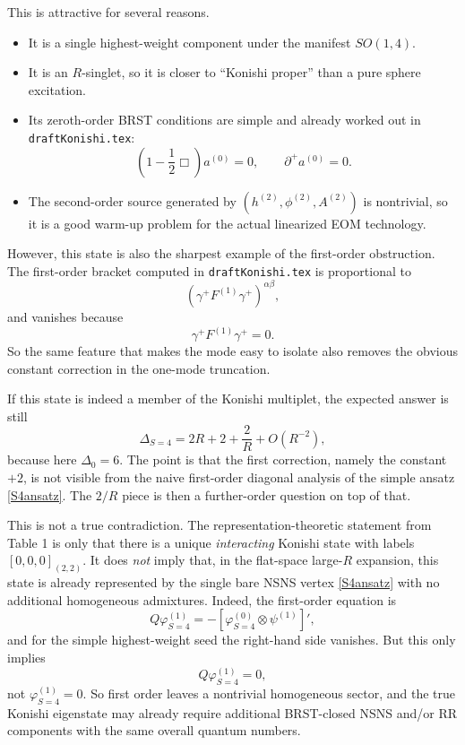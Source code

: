 \documentclass[12pt]{article}
\def\be{\begin{equation}}
\def\ee{\end{equation}}
\newcommand{\D}{\ensuremath{\Delta}}
\begin{document}
This is attractive for several reasons.
\begin{itemize}
\item It is a single highest-weight component under the manifest $SO(1,4)$.
\item It is an $R$-singlet, so it is closer to ``Konishi proper'' than a pure sphere excitation.
\item Its zeroth-order BRST conditions are simple and already worked out in \texttt{draftKonishi.tex}:
\be
\left(1-\frac{1}{2}\Box\right)a^{(0)}=0,\qquad \partial^+ a^{(0)}=0.
\label{S4BRST}
\ee
\item The second-order source generated by $(h^{(2)},\phi^{(2)},A^{(2)})$ is nontrivial, so it is a good
warm-up problem for the actual linearized EOM technology.
\end{itemize}

However, this state is also the sharpest example of the first-order obstruction.
The first-order bracket computed in \texttt{draftKonishi.tex} is proportional to
\be
(\gamma^+F^{(1)}\gamma^+)^{\alpha\beta},
\ee
and vanishes because
\be
\gamma^+F^{(1)}\gamma^+ =0.
\ee
So the same feature that makes the mode easy to isolate also removes the obvious constant
correction in the one-mode truncation.

If this state is indeed a member of the Konishi multiplet, the expected answer is still
\be
\D_{S=4}=2R+2+\frac{2}{R}+O(R^{-2}),
\ee
because here $\D_0=6$. The point is that the first correction, namely the constant $+2$, is not visible
from the naive first-order diagonal analysis of the simple ansatz \eqref{S4ansatz}. The $2/R$ piece is then
a further-order question on top of that.

This is not a true contradiction. The representation-theoretic statement from Table 1 is only that there is
a unique \emph{interacting} Konishi state with labels $[0,0,0]_{(2,2)}$. It does \emph{not} imply that, in the
flat-space large-$R$ expansion, this state is already represented by the single bare NSNS vertex
\eqref{S4ansatz} with no additional homogeneous admixtures. Indeed, the first-order equation is
\be
Q\varphi^{(1)}_{S=4}=-[\varphi^{(0)}_{S=4}\otimes\psi^{(1)}]',
\ee
and for the simple highest-weight seed the right-hand side vanishes. But this only implies
\be
Q\varphi^{(1)}_{S=4}=0,
\ee
not $\varphi^{(1)}_{S=4}=0$. So first order leaves a nontrivial homogeneous sector, and the true Konishi
eigenstate may already require additional BRST-closed NSNS and/or RR components with the same overall
quantum numbers.
\end{document}

